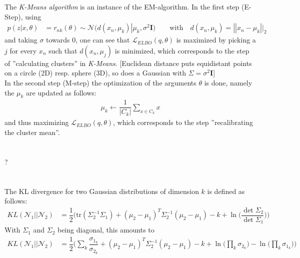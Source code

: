 \documentclass[11pt]{article}
\newcommand{\exercise}{\section{}}
\begin{document}
\noindent The \textit{K-Means algorithm} is an instance of the EM-algorithm. In the first step (E-Step), using
\begin{align*}
	p(z|x,\theta) &= r_{nk}(\theta) \sim \mathcal{N}(d(x_n, \mu_k) | \mu_k, \sigma^2 \boldsymbol{I})
	\quad\quad \text{with}\quad d(x_n, \mu_k) = ||x_n - \mu_k||_2
\end{align*}
and taking $\sigma$ towards $0$, one can see that $\mathcal{L}_{ELBO}(q, \theta)$ is maximized by picking a $j$ for every $x_n$ such that $d(x_n, \mu_j)$ is minimized, which corresponds to the step of ''calculating clusters'' in \textit{K-Means}. [Euclidean distance puts equidistant points on a circle (2D) resp. sphere (3D), so does a Gaussian with $\Sigma = \sigma^2 \boldsymbol{I}$]\\

\noindent In the second step (M-step) the optimization of the arguments $\theta$ is done, namely the $\mu_k$ are updated as follows:
\begin{align*}
	\mu_k \leftarrow \dfrac{1}{|C_k|} \sum_{x \in C_k} x
\end{align*}
and thus maximizing $\mathcal{L}_{ELBO}(q, \theta)$, which corresponds to the step ''recalibrating the cluster mean''.

\exercise
?

\exercise
The KL divergence for two Gaussian distributions of dimension $k$ is defined as follows:
\begin{align*}
	KL(\mathcal{N}_1 || \mathcal{N}_2) &= \dfrac{1}{2} \Big(\text{tr}(\Sigma_2^{-1}\Sigma_1) + (\mu_2 - \mu_1)^T \Sigma_2^{-1}(\mu_2 - \mu_1) - k + \ln\big(\dfrac{\det \Sigma_2}{\det \Sigma_1}\big)\Big)
\end{align*}
With $\Sigma_1$ and $\Sigma_2$ being diagonal, this amounts to
\begin{align*}
	KL(\mathcal{N}_1 || \mathcal{N}_2) &= \dfrac{1}{2} \Big(\sum_k \dfrac{\sigma_{1_k}}{\sigma_{2_k}} + (\mu_2 - \mu_1)^T \Sigma_2^{-1}(\mu_2 - \mu_1) - k + \ln\big(\prod_k \sigma_{2_k}{}\big) - \ln\big(\prod_k \sigma_{1_k}\big)\Big)
\end{align*}
\end{document}
